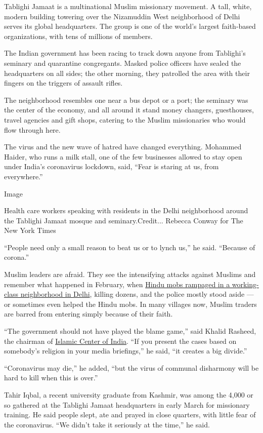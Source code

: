 Tablighi Jamaat is a multinational Muslim missionary movement. A tall,
white, modern building towering over the Nizamuddin West neighborhood of
Delhi serves its global headquarters. The group is one of the world's
largest faith-based organizations, with tens of millions of members.

The Indian government has been racing to track down anyone from
Tablighi's seminary and quarantine congregants. Masked police officers
have sealed the headquarters on all sides; the other morning, they
patrolled the area with their fingers on the triggers of assault rifles.

The neighborhood resembles one near a bus depot or a port; the seminary
was the center of the economy, and all around it stand money changers,
guesthouses, travel agencies and gift shops, catering to the Muslim
missionaries who would flow through here.

The virus and the new wave of hatred have changed everything. Mohammed
Haider, who runs a milk stall, one of the few businesses allowed to stay
open under India's coronavirus lockdown, said, ``Fear is staring at us,
from everywhere.''

Image

Health care workers speaking with residents in the Delhi neighborhood
around the Tablighi Jamaat mosque and seminary.Credit... Rebecca Conway
for The New York Times

``People need only a small reason to beat us or to lynch us,'' he said.
``Because of corona.''

Muslim leaders are afraid. They see the intensifying attacks against
Muslims and remember what happened in February, when
\href{https://www.nytimes.com/2020/03/12/world/asia/india-police-muslims.html}{Hindu
mobs rampaged in a working-class neighborhood in Delhi}, killing dozens,
and the police mostly stood aside --- or sometimes even helped the Hindu
mobs. In many villages now, Muslim traders are barred from entering
simply because of their faith.

``The government should not have played the blame game,'' said Khalid
Rasheed, the chairman of \href{http://islamiccentreofindia.com/}{Islamic
Center of India}. ``If you present the cases based on somebody's
religion in your media briefings,'' he said, ``it creates a big
divide.''

``Coronavirus may die,'' he added, ``but the virus of communal
disharmony will be hard to kill when this is over.''

Tahir Iqbal, a recent university graduate from Kashmir, was among the
4,000 or so gathered at the Tablighi Jamaat headquarters in early March
for missionary training. He said people slept, ate and prayed in close
quarters, with little fear of the coronavirus. ``We didn't take it
seriously at the time,'' he said.

